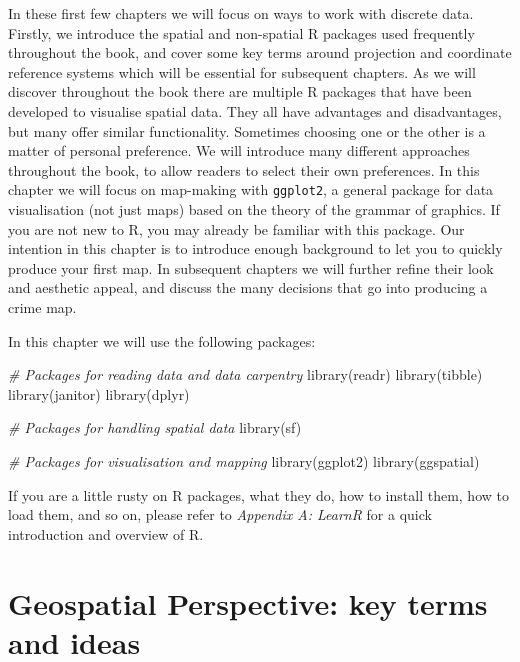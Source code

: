 \documentclass[
]{book}
\makeatletter
\newenvironment{Shaded}{\begin{snugshade}}{\end{snugshade}}
\newcommand{\CommentTok}[1]{\textcolor[rgb]{0.37,0.37,0.37}{\textit{#1}}}
\newcommand{\FunctionTok}[1]{\textcolor[rgb]{0,0,0}{#1}}
\newcommand{\NormalTok}[1]{#1}
\newenvironment{kframe}{%
\medskip{}
\setlength{\fboxsep}{.8em}
 \def\at@end@of@kframe{}%
 \ifinner\ifhmode%
  \def\at@end@of@kframe{\end{minipage}}%
  \begin{minipage}{\columnwidth}%
 \fi\fi%
 \def\FrameCommand##1{\hskip\@totalleftmargin \hskip-\fboxsep
 \colorbox{shadecolor}{##1}\hskip-\fboxsep
     \hskip-\linewidth \hskip-\@totalleftmargin \hskip\columnwidth}%
 \MakeFramed {\advance\hsize-\width
   \@totalleftmargin\z@ \linewidth\hsize
   \@setminipage}}%
 {\par\unskip\endMakeFramed%
 \at@end@of@kframe}
\renewenvironment{Shaded}{\begin{kframe}}{\end{kframe}}
\makeatother
\begin{document}
In these first few chapters we will focus on ways to work with discrete data. Firstly, we introduce the spatial and non-spatial R packages used frequently throughout the book, and cover some key terms around projection and coordinate reference systems which will be essential for subsequent chapters. As we will discover throughout the book there are multiple R packages that have been developed to visualise spatial data. They all have advantages and disadvantages, but many offer similar functionality. Sometimes choosing one or the other is a matter of personal preference. We will introduce many different approaches throughout the book, to allow readers to select their own preferences. In this chapter we will focus on map-making with \texttt{ggplot2}, a general package for data visualisation (not just maps) based on the theory of the grammar of graphics. If you are not new to R, you may already be familiar with this package. Our intention in this chapter is to introduce enough background to let you to quickly produce your first map. In subsequent chapters we will further refine their look and aesthetic appeal, and discuss the many decisions that go into producing a crime map.

In this chapter we will use the following packages:

\begin{Shaded}
\begin{Highlighting}[]
\CommentTok{\# Packages for reading data and data carpentry}
\FunctionTok{library}\NormalTok{(readr)}
\FunctionTok{library}\NormalTok{(tibble)}
\FunctionTok{library}\NormalTok{(janitor)}
\FunctionTok{library}\NormalTok{(dplyr)}

\CommentTok{\# Packages for handling spatial data}
\FunctionTok{library}\NormalTok{(sf)}

\CommentTok{\# Packages for visualisation and mapping}
\FunctionTok{library}\NormalTok{(ggplot2)}
\FunctionTok{library}\NormalTok{(ggspatial)}
\end{Highlighting}
\end{Shaded}

If you are a little rusty on R packages, what they do, how to install them, how to load them, and so on, please refer to \emph{Appendix A: LearnR} for a quick introduction and overview of R.

\hypertarget{geospatial-perspective-key-terms-and-ideas}{%
\section{Geospatial Perspective: key terms and ideas}\label{geospatial-perspective-key-terms-and-ideas}}
\end{document}
